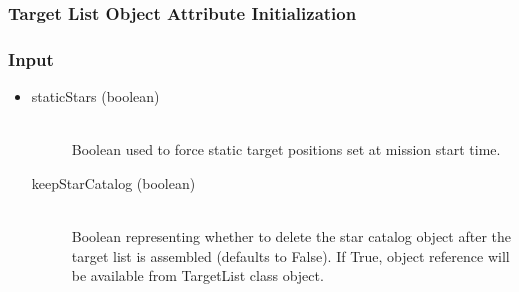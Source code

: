 \documentclass[cleanfoot]{asme2ej}
\begin{document}
\label{sec:targetlist}
\subsubsection{Target List Object Attribute Initialization}

\subsubsection*{Input}
\begin{itemize}
\item 
\begin{description}
    \item[staticStars (boolean)] \hfill \\ Boolean used to force static target positions set at mission start time.
    \item[keepStarCatalog (boolean)] \hfill \\ Boolean representing whether to delete the star catalog object after the target list is assembled (defaults to False).  If True, object reference will be available from TargetList class object.
\end{description}
\end{itemize}
\end{document}
